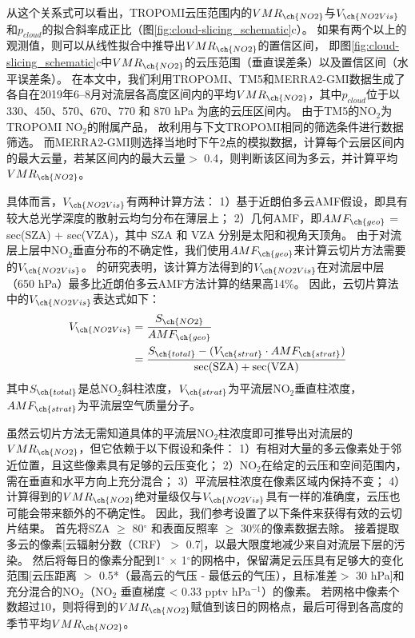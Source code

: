 从这个关系式可以看出，TROPOMI云压范围内的$VMR_{\ch{NO2}}$与$V_{\ch{NO2Vis}}$和$p_{cloud}$的拟合斜率成正比（图\ref{fig:cloud-slicing_schematic}c）。
如果有两个以上的观测值，则可以从线性拟合中推导出$VMR_{\ch{NO2}}$的置信区间，
即图\ref{fig:cloud-slicing_schematic}c中$VMR_{\ch{NO2}}$的云压范围（垂直误差条）以及置信区间（水平误差条）。
在本文中，我们利用TROPOMI、TM5和MERRA2-GMI数据生成了各自在2019年6--8月对流层各高度区间内的平均$VMR_{\ch{NO2}}$，其中$p_{cloud}$位于以 330、450、570、670、770 和 870 hPa 为底的云压区间内。
由于TM5的NO$_2$为TROPOMI NO$_2$的附属产品，
故利用与下文TROPOMI相同的筛选条件进行数据筛选。
而MERRA2-GMI则选择当地时下午2点的模拟数据，计算每个云层区间内的最大云量，若某区间内的最大云量$>$ 0.4，则判断该区间为多云，并计算平均$VMR_{\ch{NO2}}$。

具体而言，$V_{\ch{NO2Vis}}$有两种计算方法：
1）基于近朗伯多云AMF假设，即具有较大总光学深度的散射云均匀分布在薄层上\citep{Choi.2014}；
2）几何AMF，即$AMF_{\ch{geo}}$ = sec(SZA) + sec(VZA)，其中 SZA 和 VZA 分别是太阳和视角天顶角\citep{Marais.2018,Marais.2021}。
由于对流层上层中NO$_2$垂直分布的不确定性\citep{Travis.2016}，我们使用$AMF_{\ch{geo}}$来计算云切片方法需要的$V_{\ch{NO2Vis}}$。
\citet{Choi.2014}的研究表明，该计算方法得到的$V_{\ch{NO2Vis}}$在对流层中层（650 hPa）最多比近朗伯多云AMF方法计算的结果高14\%。
因此，云切片算法中的$V_{\ch{NO2Vis}}$表达式如下：
\begin{equation} \label{eq:AMF_geo}
\begin{split}
V_{\ch{NO2Vis}} & = \frac{S_{\ch{NO2}}}{AMF_{\ch{geo}}} \\
             & = \frac{S_{\ch{total}}-(V_{\ch{strat}} \cdot AMF_{\ch{strat}})}{\sec (\mathrm{SZA})+\sec (\mathrm{VZA})}
\end{split}
\end{equation}
其中$S_{\ch{total}}$是总NO$_2$斜柱浓度，$V_{\ch{strat}}$为平流层NO$_2$垂直柱浓度，$AMF_{\ch{strat}}$为平流层空气质量分子。


虽然云切片方法无需知道具体的平流层NO$_2$柱浓度即可推导出对流层的$VMR_{\ch{NO2}}$，但它依赖于以下假设和条件：
1）有相对大量的多云像素处于邻近位置，且这些像素具有足够的云压变化；
2）NO$_2$在给定的云压和空间范围内，需在垂直和水平方向上充分混合；
3）平流层柱浓度在像素区域内保持不变；
4）计算得到的$VMR_{\ch{NO2}}$绝对量级仅与$V_{\ch{NO2Vis}}$具有一样的准确度，云压也可能会带来额外的不确定性。
因此，我们参考\citet{Marais.2021}设置了以下条件来获得有效的云切片结果。
首先将SZA $\geq$ 80$^{\circ}$ 和表面反照率 $\geq$  30\%的像素数据去除。
接着提取多云的像素[云辐射分数（CRF）$>$ 0.7]，以最大限度地减少来自对流层下层的污染。
然后将每日的像素分配到1$^{\circ}$ $\times$ 1$^{\circ}$的网格中，保留满足云压具有足够大的变化范围[云压距离 $>$ 0.5*（最高云的气压 - 最低云的气压），且标准差$>$ 30 hPa]和充分混合的NO$_2$（NO$_2$ 垂直梯度 < 0.33 pptv hPa$^{-1}$）的像素。
若网格中像素个数超过10，则将得到的$VMR_{\ch{NO2}}$赋值到该日的网格点，最后可得到各高度的季节平均$VMR_{\ch{NO2}}$。



